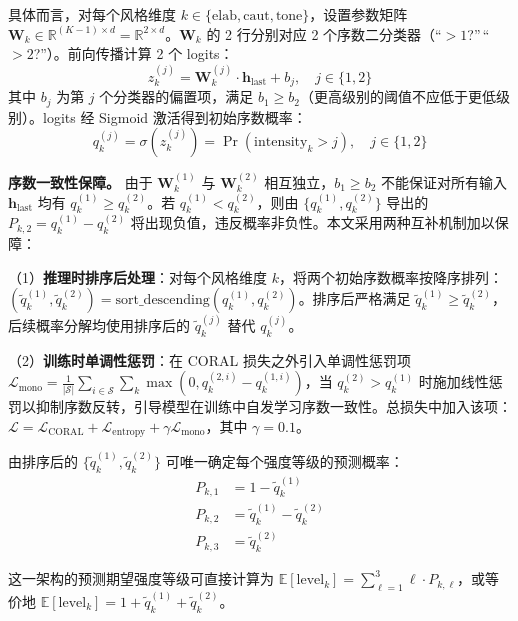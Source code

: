 \documentclass[fontset=fandol,type=master,campus=shenzhen,etitleauto=true]{hithesisbook}
\begin{document}
具体而言，对每个风格维度 $k \in \{\text{elab}, \text{caut}, \text{tone}\}$，设置参数矩阵 $\mathbf{W}_k \in \mathbb{R}^{(K-1) \times d} = \mathbb{R}^{2 \times d}$。$\mathbf{W}_k$ 的 2 行分别对应 2 个序数二分类器（``$>1$?''\,``$>2$?''）。前向传播计算 2 个 logits：
\begin{equation}
z_k^{(j)} = \mathbf{W}_k^{(j)} \cdot \mathbf{h}_{\text{last}} + b_j, \quad j \in \{1,2\}
\end{equation}
其中 $b_j$ 为第 $j$ 个分类器的偏置项，满足 $b_1 \geq b_2$（更高级别的阈值不应低于更低级别）。logits 经 Sigmoid 激活得到初始序数概率：
\begin{equation}
q_k^{(j)} = \sigma(z_k^{(j)}) = \Pr(\text{intensity}_k > j), \quad j \in \{1,2\}
\end{equation}

\noindent \textbf{序数一致性保障。} 由于 $\mathbf{W}_k^{(1)}$ 与 $\mathbf{W}_k^{(2)}$ 相互独立，$b_1 \geq b_2$ 不能保证对所有输入 $\mathbf{h}_{\text{last}}$ 均有 $q_k^{(1)} \geq q_k^{(2)}$。若 $q_k^{(1)} < q_k^{(2)}$，则由 $\{q_k^{(1)}, q_k^{(2)}\}$ 导出的 $P_{k,2} = q_k^{(1)} - q_k^{(2)}$ 将出现负值，违反概率非负性。本文采用两种互补机制加以保障：

（1）\textbf{推理时排序后处理}：对每个风格维度 $k$，将两个初始序数概率按降序排列：$(\tilde{q}_k^{(1)}, \tilde{q}_k^{(2)}) = \text{sort\_descending}(q_k^{(1)}, q_k^{(2)})$。排序后严格满足 $\tilde{q}_k^{(1)} \geq \tilde{q}_k^{(2)}$，后续概率分解均使用排序后的 $\tilde{q}_k^{(j)}$ 替代 $q_k^{(j)}$。

（2）\textbf{训练时单调性惩罚}：在 CORAL 损失之外引入单调性惩罚项 $\mathcal{L}_{\text{mono}} = \frac{1}{|\mathcal{S}|} \sum_{i \in \mathcal{S}} \sum_{k} \max(0, q_k^{(2,i)} - q_k^{(1,i)})$，当 $q_k^{(2)} > q_k^{(1)}$ 时施加线性惩罚以抑制序数反转，引导模型在训练中自发学习序数一致性。总损失中加入该项：$\mathcal{L} = \mathcal{L}_{\text{CORAL}} + \mathcal{L}_{\text{entropy}} + \gamma \mathcal{L}_{\text{mono}}$，其中 $\gamma = 0.1$。

由排序后的 $\{\tilde{q}_k^{(1)}, \tilde{q}_k^{(2)}\}$ 可唯一确定每个强度等级的预测概率：
\begin{equation}
\begin{aligned}
P_{k,1} &= 1 - \tilde{q}_k^{(1)} \\
P_{k,2} &= \tilde{q}_k^{(1)} - \tilde{q}_k^{(2)} \\
P_{k,3} &= \tilde{q}_k^{(2)}
\end{aligned}
\end{equation}

这一架构的预测期望强度等级可直接计算为 $\mathbb{E}[\text{level}_k] = \sum_{\ell=1}^{3} \ell \cdot P_{k,\ell}$，或等价地 $\mathbb{E}[\text{level}_k] = 1 + \tilde{q}_k^{(1)} + \tilde{q}_k^{(2)}$。
\end{document}
